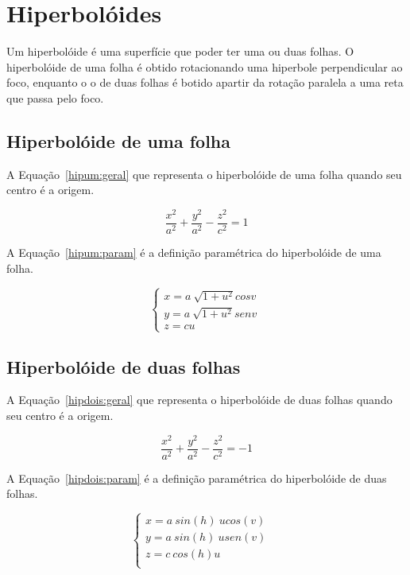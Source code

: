 \documentclass[
	article,			%
	11pt,				%
	oneside,			%
	a4paper,			%
	english,			%
	brazil,				%
	]{abntex2}
\begin{document}
	\section{Hiperbolóides} 

		Um hiperbolóide é uma superfície que poder ter uma ou duas folhas. O
		hiperbolóide de uma folha é obtido rotacionando uma hiperbole
		perpendicular ao foco, enquanto o o de duas folhas é botido apartir da
		rotação paralela a uma reta que passa pelo foco.

		\subsection{Hiperbolóide de uma folha}

		A Equação~\ref{hipum:geral} que representa o hiperbolóide de uma
		folha quando seu centro é a origem.

		\begin{equation}\label{hipum:geral}
			\frac{x^2}{a^2}+\frac{y^2}{a^2}-\frac{z^2}{c^2}=1
		\end{equation}


		A Equação~\ref{hipum:param} é a definição paramétrica do hiperbolóide
		de uma folha.

		\begin{equation}\label{hipum:param}
			\begin{cases}
				x = a\ \sqrt{1 + u^2} cos v~\\
				y = a\ \sqrt{1 + u^2} sen v~\\
				z = cu
			\end{cases}
		\end{equation}

		\subsection{Hiperbolóide de duas folhas}

		A Equação~\ref{hipdois:geral} que representa o hiperbolóide de duas
		folhas quando seu centro é a origem.

		\begin{equation}\label{hipdois:geral}
			\frac{x^2}{a^2}+\frac{y^2}{a^2}-\frac{z^2}{c^2}=-1
		\end{equation}


		A Equação~\ref{hipdois:param} é a definição paramétrica do hiperbolóide
		de duas folhas.

		\begin{equation}\label{hipdois:param}
			\begin{cases}
				x = a\ sin(h)\ u cos(v)&~\\
				y = a\ sin(h)\ u sen(v)&~\\
				z = c\ cos(h) u~\\
			\end{cases}
		\end{equation}
\end{document}
